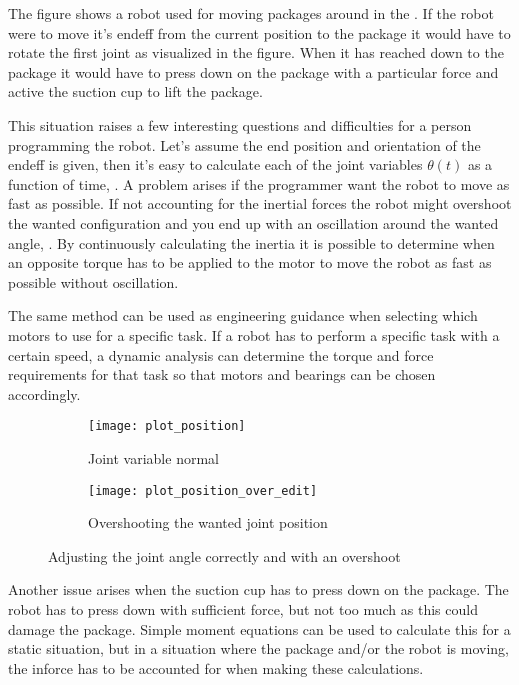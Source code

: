 The figure shows a robot used for moving packages around in the . If the robot were to move it's \gls{endeff} from the current position to the package it would have to rotate the first joint as visualized in the figure. When it has reached down to the package it would have to press down on the package with a particular force and active the suction cup to lift the package.

This situation raises a few interesting questions and difficulties for a person programming the robot. Let's assume the end position and orientation of the \gls{endeff} is given, then it's easy to calculate each of the joint variables $\theta (t)$ as a function of time, . A problem arises if the programmer want the robot to move as fast as possible. If not accounting for the inertial forces the robot might overshoot the wanted configuration and you end up with an oscillation around the wanted angle, . By continuously calculating the inertia it is possible to determine when an opposite torque has to be applied to the motor to move the robot as fast as possible without oscillation.

The same method can be used as engineering guidance when selecting which motors to use for a specific task. If a robot has to perform a specific task with a certain speed, a dynamic analysis can determine the torque and force requirements for that task so that motors and bearings can be chosen accordingly.

\begin{figure}[ht!]
\begin{subfigure}{0.5\textwidth}
    \centering
    \texttt{[image: plot\_position]}
    \caption{Joint variable normal}
    \label{plot_position}
\end{subfigure}
\hfill
\begin{subfigure}{0.5\textwidth}
    \centering
    \texttt{[image: plot\_position\_over\_edit]}
    \caption{Overshooting the wanted joint position}
    \label{plot_position_over}
\end{subfigure}
\caption{Adjusting the joint angle correctly and with an overshoot}
\label{joint_position}
\end{figure}

Another issue arises when the suction cup has to press down on the package. The robot has to press down with sufficient force, but not too much as this could damage the package. Simple moment equations can be used to calculate this for a static situation, but in a situation where the package and/or the robot is moving, the \gls{inforce} has to be accounted for when making these calculations.


